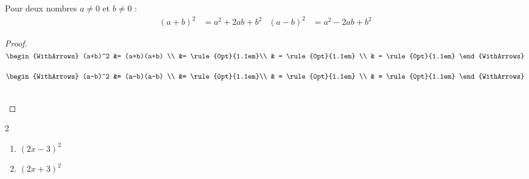 \begin{theorem}
	Pour deux nombres $a\neq 0$ et $b\neq 0$ :
	\begin{align*}
		(a+b)^2 &= a^2+2ab+b^2  & 	(a-b)^2 &= a^2-2ab+b^2   
	\end{align*} 
\end{theorem}
\begin{proof}\hfill 

\noindent \parbox{0.45\linewidth}{	
	$\begin{WithArrows}
	(a+b)^2 &= (a+b)(a+b) \\
		&= \rule{0pt}{1.1em}\\
		& = \rule{0pt}{1.1em}  \\
		& = \rule{0pt}{1.1em}  
	\end{WithArrows}$ 	
}\hfill\parbox{0.45\linewidth}{	
	$\begin{WithArrows}
	(a-b)^2 &=  (a-b)(a-b) \\
		&= \rule{0pt}{1.1em}\\
		& = \rule{0pt}{1.1em}  \\
		& = \rule{0pt}{1.1em}  
	\end{WithArrows}$ 	
} \\
\null	
\end{proof} 
\begin{example} \hfill 
	\begin{multicols}{2}
		\begin{enumerate}[label={$\Alph*(x)=$},leftmargin=*]
			\item $(2x-3)^2$  
			\item $(2x+3)^2$ 
		\end{enumerate}
	\end{multicols}
\end{example}







